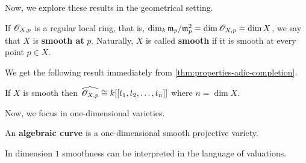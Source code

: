 Now, we explore these results in the geometrical setting. 
\begin{definition}\label{def:}
	If ${\mathscr O}_{X,p}$ is a regular local ring, that is, $\dim_{k} \mathfrak{m}_{p}/\mathfrak{m}_{p}^{2} = \dim {\mathscr O}_{X,p} = \dim X$, we say that $X$ is \textbf{smooth at} $p$. Naturally, $X$ is called \textbf{smooth} if it is smooth at every point $p\in X$.
\end{definition}
We get the following result immediately from \cref{thm:properties-adic-completion}.
\begin{corollary}\label{cor:smooth-iff-isomorphic-to-power-series}
	If $X$ is smooth then $\widehat{{\mathscr O}_{X,p}} \cong k[[t_{1}, t_{2}, \ldots, t_{n}]]$ where $n = \dim X$.
\end{corollary}
Now, we focus in one-dimensional varieties.
\begin{definition}\label{def:algebraic-curve}
	An \textbf{algebraic curve} is a one-dimensional smooth projective variety.
\end{definition}
In dimension $1$ smoothness can be interpreted in the language of valuations.
